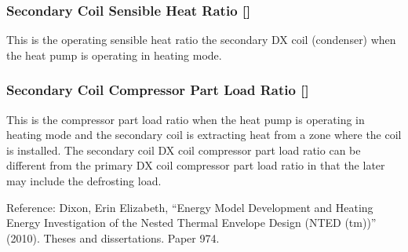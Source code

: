 \subsubsection{Secondary Coil Sensible Heat Ratio {[]}}\label{secondary-coil-sensible-heat-ratio}

This is the operating sensible heat ratio the secondary DX coil (condenser) when the heat pump is operating in heating mode.

\subsubsection{Secondary Coil Compressor Part Load Ratio {[]}}\label{secondary-coil-compressor-part-load-ratio}

This is the compressor part load ratio when the heat pump is operating in heating mode and the secondary coil is extracting heat from a zone where the coil is installed. The secondary coil DX coil compressor part load ratio can be different from the primary DX coil compressor part load ratio in that the later may include the defrosting load.

Reference: Dixon, Erin Elizabeth, ``Energy Model Development and Heating Energy Investigation of the Nested Thermal Envelope Design (NTED (tm))'' (2010). Theses and dissertations. Paper 974.
